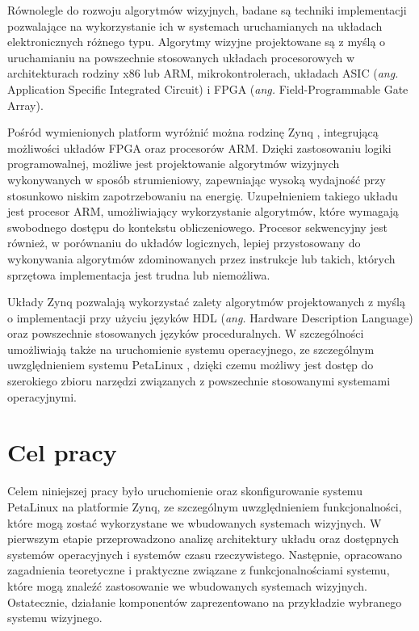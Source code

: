 Równolegle do rozwoju algorytmów wizyjnych, badane są techniki implementacji pozwalające na wykorzystanie ich w systemach uruchamianych na układach elektronicznych różnego typu. 
Algorytmy wizyjne projektowane są z myślą o uruchamianiu na powszechnie stosowanych układach procesorowych w architekturach rodziny x86 lub ARM, mikrokontrolerach, układach ASIC (\emph{ang.} Application Specific Integrated Circuit) i FPGA (\emph{ang.} Field-Programmable Gate Array).

Pośród wymienionych platform wyróżnić można rodzinę Zynq \cite{zybo-reference-manual}, integrującą możliwości układów FPGA oraz procesorów ARM. 
Dzięki zastosowaniu logiki programowalnej, możliwe jest projektowanie algorytmów wizyjnych wykonywanych w sposób strumieniowy, zapewniając wysoką wydajność przy stosunkowo niskim zapotrzebowaniu na energię.
Uzupełnieniem takiego układu jest procesor ARM, umożliwiający wykorzystanie algorytmów, które wymagają swobodnego dostępu do kontekstu obliczeniowego. 
Procesor sekwencyjny jest również, w porównaniu do układów logicznych, lepiej przystosowany do wykonywania algorytmów zdominowanych przez instrukcje lub takich, których sprzętowa implementacja jest trudna lub niemożliwa.

Układy Zynq pozwalają wykorzystać zalety algorytmów projektowanych z myślą o implementacji przy użyciu języków HDL (\emph{ang.} Hardware Description Language) oraz powszechnie stosowanych języków proceduralnych. 
W szczególności umożliwiają także na uruchomienie systemu operacyjnego, ze szczególnym uwzględnieniem systemu PetaLinux \cite{petalinux-tools}, dzięki czemu możliwy jest dostęp do szerokiego zbioru narzędzi związanych z powszechnie stosowanymi systemami operacyjnymi.

\section{Cel pracy}

Celem niniejszej pracy było uruchomienie oraz skonfigurowanie systemu PetaLinux na platformie Zynq, ze szczególnym uwzględnieniem funkcjonalności, które mogą zostać wykorzystane we wbudowanych systemach wizyjnych.
W pierwszym etapie przeprowadzono analizę architektury układu oraz dostępnych systemów operacyjnych i systemów czasu rzeczywistego. 
Następnie, opracowano zagadnienia teoretyczne i praktyczne związane z funkcjonalnościami systemu, które mogą znaleźć zastosowanie we wbudowanych systemach wizyjnych. 
Ostatecznie, działanie komponentów zaprezentowano na przykładzie wybranego systemu wizyjnego.

